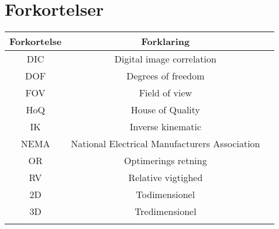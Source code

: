 \chapter*{Forkortelser}

\renewcommand{\arraystretch}{1.5} %
\begin{longtable}{c c c}
\textbf{Forkortelse}  & \textbf{Forklaring} \\
\hline
\endhead
    DIC & Digital image correlation  \\
    DOF & Degrees of freedom\\
    FOV & Field of view \\
    HoQ & House of Quality \\
    IK & Inverse kinematic\\
    NEMA & National Electrical Manufacturers Association \\
    OR & Optimerings retning \\
    RV & Relative vigtighed \\
    2D & Todimensionel\\
    3D & Tredimensionel\\
\label{tab:forkortelser}
\end{longtable}
